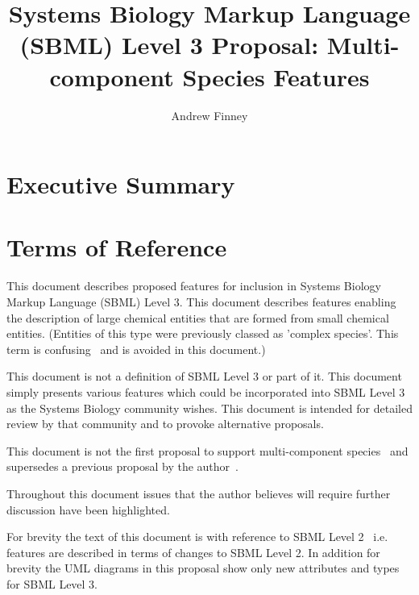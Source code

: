 \documentclass{cekarticle}
\begin{document}

\title{Systems Biology Markup Language (SBML) Level 3 Proposal: Multi-component Species Features}

\author{Andrew Finney}


\maketitlepage

\section{Executive Summary}
\label{Executive Summary}

\section{Terms of Reference}
\label{sec:t-o-r}

This document describes proposed features for inclusion in
Systems Biology Markup Language (SBML) Level 3. This document
describes features enabling the description of large chemical entities that are formed
from small chemical entities.  (Entities of this type were previously classed as 'complex species'.
This term is confusing~\citep{phair:2003} and is avoided in this document.)  

This document is not a definition of SBML Level 3 or part of it.
This document simply presents various features which could be
incorporated into SBML Level 3 as the Systems Biology community
wishes.  This document is intended for detailed review by that
community and to provoke alternative proposals.  

This document is not the first proposal to support multi-component species~\citep{lenovere:2002}
and supersedes a previous proposal by the author~\citep{finney:2001f}.

Throughout this
document issues that the author believes will require further
discussion have been highlighted.

For brevity the text of this document is with reference to SBML
Level 2~\citep{finney:2002f} i.e. features are described in terms
of changes to SBML Level 2.  In addition for brevity the UML diagrams in this proposal
show only new attributes and types for SBML Level 3.  
\end{document}
